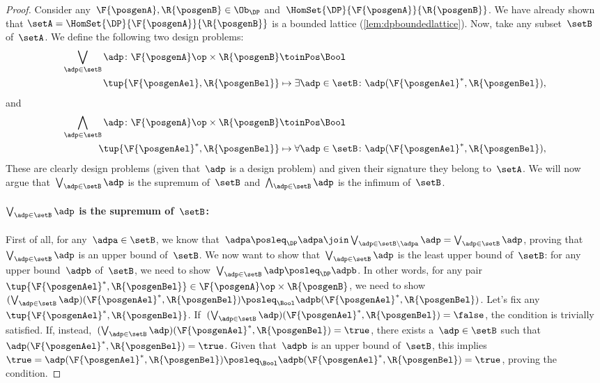\begin{proof}
    Consider any~$\F{\posgenA},\R{\posgenB}\in \Ob_\DP$ and~$\HomSet{\DP}{\F{\posgenA}}{\R{\posgenB}}$.
    We have already shown that $\setA=\HomSet{\DP}{\F{\posgenA}}{\R{\posgenB}}$ is a bounded lattice (\cref{lem:dpboundedlattice}).
    Now, take any subset~$\setB$ of~$\setA$.
    We define the following two design problems:
    \begin{equation*}
        \begin{aligned}
            \bigvee_{\adp \in \setB} \adp\colon \F{\posgenA}\op \times \R{\posgenB}&\toinPos \Bool\\
            \tup{\F{\posgenAel},\R{\posgenBel}}&\mapsto \exists \adp\in \setB\colon \adp(\F{\posgenAel}^*,\R{\posgenBel}),
        \end{aligned}
    \end{equation*}
    and
    \begin{equation*}
        \begin{aligned}
            \bigwedge_{\adp \in \setB} \adp\colon \F{\posgenA}\op \times \R{\posgenB}&\toinPos \Bool\\
            \tup{\F{\posgenAel}^*,\R{\posgenBel}}&\mapsto \forall \adp\in \setB\colon \adp(\F{\posgenAel}^*,\R{\posgenBel}),
        \end{aligned}
    \end{equation*}
    These are clearly design problems (given that~$\adp$ is a design problem) and given their signature they belong to~$\setA$.
    We will now argue that~$\bigvee_{\adp \in \setB} \adp$ is the supremum of~$\setB$ and~$\bigwedge_{\adp \in \setB} \adp$ is the infimum of~$\setB$.
    \paragraph*{$\bigvee_{\adp \in \setB} \adp$ is the supremum of~$\setB$:}
    First of all, for any~$\adpa\in \setB$, we know that~$\adpa\posleq_\DP \adpa \join \bigvee_{\adp \in \setB \backslash \adpa} \adp= \bigvee_{\adp \in \setB} \adp$, proving that~$\bigvee_{\adp \in \setB} \adp$ is an upper bound of~$\setB$.
    We now want to show that~$\bigvee_{\adp \in \setB} \adp$ is the least upper bound of~$\setB$: for any upper bound~$\adpb$ of~$\setB$, we need to show~$\bigvee_{\adp \in \setB} \adp \posleq_\DP\adpb$.
    In other words, for any pair~$\tup{\F{\posgenAel}^*,\R{\posgenBel}}\in \F{\posgenA}\op\times \R{\posgenB}$, we need to show~$(\bigvee_{\adp \in \setB} \adp)(\F{\posgenAel}^*,\R{\posgenBel})\posleq_\Bool \adpb(\F{\posgenAel}^*,\R{\posgenBel})$.
    Let's fix any~$\tup{\F{\posgenAel}^*,\R{\posgenBel}}$. If~$(\bigvee_{\adp \in \setB} \adp)(\F{\posgenAel}^*,\R{\posgenBel})=\false$, the condition is trivially satisfied.
    If, instead,~$(\bigvee_{\adp \in \setB} \adp)(\F{\posgenAel}^*,\R{\posgenBel})=\true$, there exists a~$\adp\in \setB$ such that~$\adp(\F{\posgenAel}^*,\R{\posgenBel})=\true$.
    Given that~$\adpb$ is an upper bound of~$\setB$, this implies~$\true=\adp(\F{\posgenAel}^*,\R{\posgenBel})\posleq_\Bool \adpb(\F{\posgenAel}^*,\R{\posgenBel})=\true$, proving the condition.
    

\end{proof}
